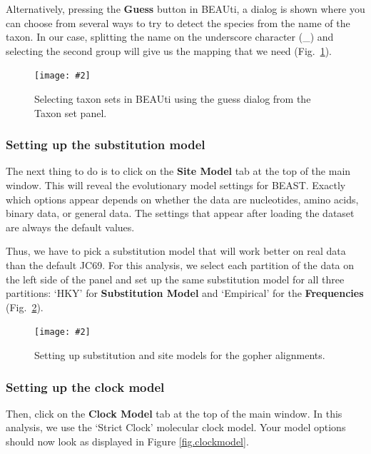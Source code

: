 \documentclass{article}
\newcommand{\includeimage}[2][]{%
\texttt{[image: \#2]}
}
\begin{document}
Alternatively, pressing the {\bf Guess} button in BEAUti, a dialog is shown where you can choose from several ways to try to detect the species from the name of the taxon. In our case, splitting the name on the underscore character (\_) and selecting the second group will give us the mapping that we need (Fig.~\ref{fig.taxonset}).

\begin{figure}[h]
\centering
\includeimage[width=\textwidth]{figures/BEAUti_Guess_Taxonsets}
\caption{\label{fig.taxonset} Selecting taxon sets in BEAUti using the guess dialog from the Taxon set panel.}
\end{figure}

\subsubsection{Setting up the substitution model}

The next thing to do is to click on the {\bf Site Model} tab at the top of the
main window. This will reveal the evolutionary model settings for
BEAST. Exactly which options appear depends on whether the data are
nucleotides, amino acids, binary data, or general data.
The settings that appear after loading the dataset are always 
the default values.

Thus, we have to pick a substitution model that will work better on real data than the default JC69.
For this analysis, we select each partition
of the data on the left side of the panel and set up the same substitution model for all three partitions:
`HKY' for {\bf Substitution Model} and `Empirical' for the {\bf Frequencies} (Fig.~\ref{fig.sitemodel}).

\begin{figure}[h]
\centering
\includeimage[width=\textwidth,clip=true,trim=0 450 0 0]{figures/BEAUti_Site_Model}
\caption{\label{fig.sitemodel} Setting up substitution and site models for the gopher alignments.}
\end{figure}

\clearpage

\subsubsection{Setting up the clock model}

Then, click on the {\bf Clock Model} tab at the top of the main window. In this analysis, we use the `Strict Clock' molecular clock model.
Your model options should now look as displayed in Figure \ref{fig.clockmodel}. 
\end{document}

